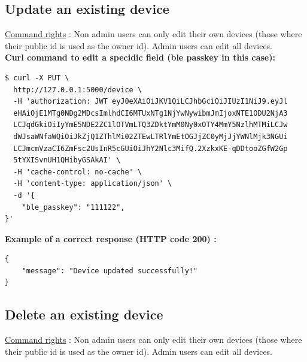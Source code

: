 \subsection{Update an existing device}
\underline{Command rights} : Non admin users can only edit their own devices (those where their public id is used as the owner id). Admin users can edit all devices.\\

\textbf{Curl command to edit a specidic field (ble passkey in this case):}

\begin{tcolorbox}[top=-3mm, bottom=-3mm, left=0mm, right=0mm, enhanced, breakable, colback=LightGray, colframe=DarkGray, colbacktitle=DarkGray]
\begin{verbatim}
$ curl -X PUT \
  http://127.0.0.1:5000/device \
  -H 'authorization: JWT eyJ0eXAiOiJKV1QiLCJhbGciOiJIUzI1NiJ9.eyJl
  eHAiOjE1MTg0NDg2MDcsImlhdCI6MTUxNTg1NjYwNywibmJmIjoxNTE1ODU2NjA3
  LCJqdGkiOiIyYmE5NDE2ZC1lOTVmLTQ3ZDktYmM0Ny0xOTY4MmY5NzlhMTMiLCJw
  dWJsaWNfaWQiOiJkZjQ1ZThlMi02ZTEwLTRlYmEtOGJjZC0yMjJjYWNlMjk3NGUi
  LCJmcmVzaCI6ZmFsc2UsInR5cGUiOiJhY2Nlc3MifQ.2XzkxKE-qDDtooZGfW2Gp
  5tYXISvnUH1QHibyGSAkAI' \
  -H 'cache-control: no-cache' \
  -H 'content-type: application/json' \
  -d '{
    "ble_passkey": "111122",
}'
\end{verbatim}
\end{tcolorbox}

\textbf{Example of a correct response (HTTP code 200) : }

\begin{tcolorbox}[top=-3mm, bottom=-3mm, left=0mm, right=0mm, enhanced, breakable, colback=LightGray, colframe=DarkGray, colbacktitle=DarkGray]
\begin{verbatim}
{
    "message": "Device updated successfully!"
}
\end{verbatim}
\end{tcolorbox}

\subsection{Delete an existing device}
\underline{Command rights} : Non admin users can only edit their own devices (those where their public id is used as the owner id). Admin users can edit all devices.\\

